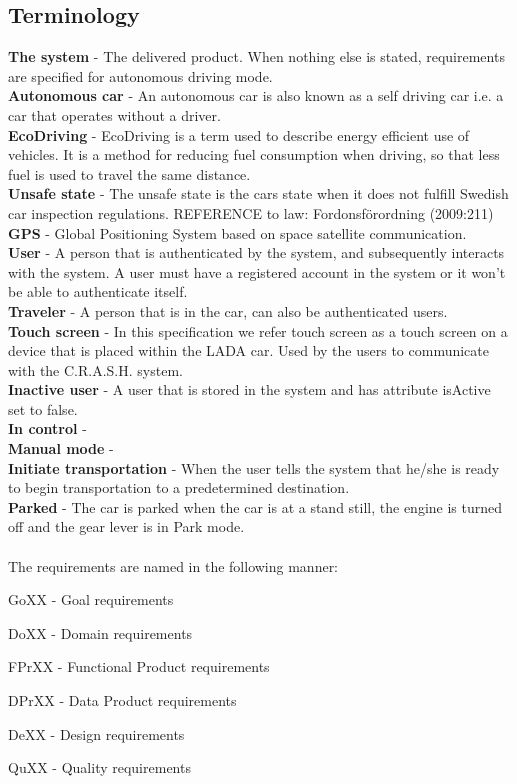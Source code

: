 \documentclass{article}
\begin{document}
\subsection{Terminology}
\textbf{The system} - The delivered product. When nothing else is stated, requirements are specified for autonomous driving mode.\\
\textbf{Autonomous car} - An autonomous car is also known as a self driving car i.e. a car that operates without a driver. \\
\textbf{EcoDriving} - EcoDriving is a term used to describe energy efficient use of vehicles. It is a method for reducing fuel consumption when driving, so that less fuel is used to travel the same distance.\\
\textbf{Unsafe state} - The unsafe state is the cars state when it does not fulfill Swedish car inspection regulations.
REFERENCE to law: Fordonsförordning (2009:211) \\
\textbf{GPS} - Global Positioning System based on space satellite communication.\\
\textbf{User} - A person that is authenticated by the system, and subsequently interacts with the system. A user must have a registered account in the system or it won't be able to authenticate itself. \\
\textbf{Traveler} - A person that is in the car, can also be authenticated users. \\
\textbf{Touch screen} - In this specification we refer touch screen as a touch screen on a device that is placed within the LADA car. Used by the users to  communicate with the C.R.A.S.H. system. \\
\textbf{Inactive user} - A user that is stored in the system and has attribute isActive set to false. \\
\textbf{In control} - \\
\textbf{Manual mode} - \\
\textbf{Initiate transportation} - When the user tells the system that he/she is ready to begin transportation to a predetermined destination. \\
\textbf{Parked} - The car is parked when the car is at a stand still, the engine is turned off and the gear lever is in Park mode.  \\
\\
The requirements are named in the following manner:
\begin{description*}
\item[GoXX] - Goal requirements 
\item[DoXX] - Domain requirements 
\item[FPrXX] - Functional Product requirements 
\item[DPrXX] - Data Product requirements 
\item[DeXX] - Design requirements 
\item[QuXX] - Quality requirements 
\end{description*}
\medskip
\end{document}
